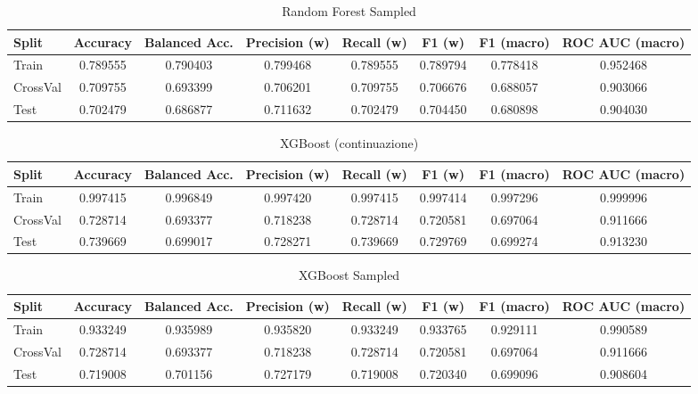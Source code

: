 \begin{table}[H]
	\centering
	\caption{Random Forest Sampled}
	\begin{adjustbox}{max width=\textwidth}
		\begin{tabular}{lccccccc}
			\toprule
			Split & Accuracy & Balanced Acc. & Precision (w) & Recall (w) & F1 (w) & F1 (macro) & ROC AUC (macro) \\
			\midrule
			Train & 0.789555 & 0.790403 & 0.799468 & 0.789555 & 0.789794 & 0.778418 & 0.952468 \\
			CrossVal & 0.709755 & 0.693399 & 0.706201 & 0.709755 & 0.706676 & 0.688057 & 0.903066 \\
			Test & 0.702479 & 0.686877 & 0.711632 & 0.702479 & 0.704450 & 0.680898 & 0.904030 \\
			\bottomrule
		\end{tabular}
	\end{adjustbox}
\end{table}

\begin{table}[H]
	\centering
	\caption{XGBoost (continuazione)}
	\begin{adjustbox}{max width=\textwidth}
		\begin{tabular}{lccccccc}
			\toprule
			Split & Accuracy & Balanced Acc. & Precision (w) & Recall (w) & F1 (w) & F1 (macro) & ROC AUC (macro) \\
			\midrule
			Train & 0.997415 & 0.996849 & 0.997420 & 0.997415 & 0.997414 & 0.997296 & 0.999996 \\
			CrossVal & 0.728714 & 0.693377 & 0.718238 & 0.728714 & 0.720581 & 0.697064 & 0.911666 \\
			Test & 0.739669 & 0.699017 & 0.728271 & 0.739669 & 0.729769 & 0.699274 & 0.913230 \\
			\bottomrule
		\end{tabular}
	\end{adjustbox}
\end{table}

\begin{table}[H]
	\centering
	\caption{XGBoost Sampled}
	\begin{adjustbox}{max width=\textwidth}
		\begin{tabular}{lccccccc}
			\toprule
			Split & Accuracy & Balanced Acc. & Precision (w) & Recall (w) & F1 (w) & F1 (macro) & ROC AUC (macro) \\
			\midrule
			Train & 0.933249 & 0.935989 & 0.935820 & 0.933249 & 0.933765 & 0.929111 & 0.990589 \\
			CrossVal & 0.728714 & 0.693377 & 0.718238 & 0.728714 & 0.720581 & 0.697064 & 0.911666 \\
			Test & 0.719008 & 0.701156 & 0.727179 & 0.719008 & 0.720340 & 0.699096 & 0.908604 \\
			\bottomrule
		\end{tabular}
	\end{adjustbox}
\end{table}
